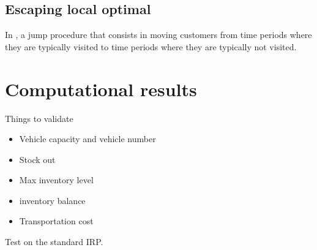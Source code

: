 \documentclass{article}
\begin{document}


\newpage 
\subsection{Escaping local optimal}

In \cite{archetti2012hybrid}, a jump procedure that consists in moving customers from time periods where they are typically visited to time periods where they are typically not visited.

\section{Computational results}

Things to validate
\begin{itemize}
    \item Vehicle capacity and vehicle number
\item Stock out
\item Max inventory level
\item inventory balance
\item Transportation cost
\end{itemize}

Test on the standard IRP.



 

\end{document}
